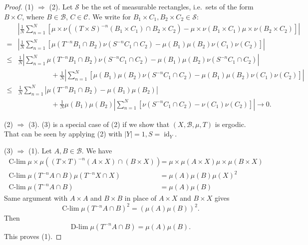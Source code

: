 \documentclass{article}
\DeclareMathOperator*{\dlim}{D-lim}
\DeclareMathOperator*{\clim}{C-lim}
\begin{document}
\begin{proof}
  (1) $\Rightarrow$ (2). Let $\mathcal{S}$ be the set of measurable rectangles, i.e.\ sets of the form $B \times C$, where $B \in \mathcal{B}$, $C \in \mathcal{C}$.
  We write for $B_1 \times C_1, B_2 \times C_2 \in \mathcal{S}$:
  \begin{align*}
    &\left|\frac{1}{N} \sum_{n=1}^N [\mu \times \nu((T \times S)^{-n} (B_1 \times C_1) \cap B_2 \times C_2) - \mu \times \nu (B_1 \times C_1) \mu \times \nu(B_2 \times C_2)]\right| \\
    =
    &\left|\frac{1}{N} \sum_{n=1}^N [\mu (T^{-n} B_1 \cap B_2) \nu(S^{-n} C_1 \cap C_2) - \mu(B_1) \mu(B_2) \nu(C_1) \nu(C_2)]\right| \\
    \leq & \frac{1}{N} \left| \sum_{n=1}^N \mu(T^{-n}B_1 \cap B_2) \nu(S^{-n} C_1 \cap C_2) - \mu(B_1) \mu(B_2) \nu(S^{-n}C_1 \cap C_2)\right| \\
         &\hspace{2cm} + \frac{1}{N} \left|\sum_{n=1}^N \left[\mu(B_1) \mu(B_2) \nu(S^{-n} C_1 \cap C_2) - \mu(B_1) \mu(B_2) \nu(C_1) \nu(C_2)\right] \right| \\
    \leq &\frac{1}{N} \sum_{n=1}^N |\mu(T^{-n} B_1 \cap B_2) - \mu(B_1) \mu(B_2)| \\
         &\hspace{2cm} + \frac{1}{N} \mu(B_1) \mu(B_2) \left|\sum_{n=1}^N \left[\nu(S^{-n} C_1 \cap C_2) - \nu(C_1) \nu(C_2)\right] \right|
    \to 0.
  \end{align*}

  (2) $\Rightarrow$ (3). (3) is a special case of (2) if we show that $(X, \mathcal{B}, \mu, T)$ is ergodic. That can be seen by applying (2) with $|Y| = 1, S = \operatorname{id}_Y$.

  (3) $\Rightarrow$ (1). Let $A, B \in \mathcal{B}$. We have
  \begin{align*}
    \clim \mu \times \mu ((T \times T)^{-n} (A \times X) \cap (B \times X)) &= \mu \times \mu(A \times X) \mu \times \mu(B \times X) \\
    \clim \mu(T^{-n} A \cap B) \mu(T^{-n} X \cap X) &= \mu(A) \mu(B) \mu(X)^2 \\
    \clim \mu(T^{-n} A \cap B) &= \mu(A) \mu(B)
  \end{align*}
  Same argument with $A \times A$ and $B \times B$ in place of $A \times X$ and $B \times X$ gives
  \begin{equation*}
    \clim \mu(T^{-n} A \cap B)^2 = (\mu(A) \mu(B))^2.
  \end{equation*}
  Then
  \begin{equation*}
    \dlim \mu(T^{-n} A \cap B) = \mu(A) \mu(B).
  \end{equation*}
  This proves (1).


\end{proof}
\end{document}
